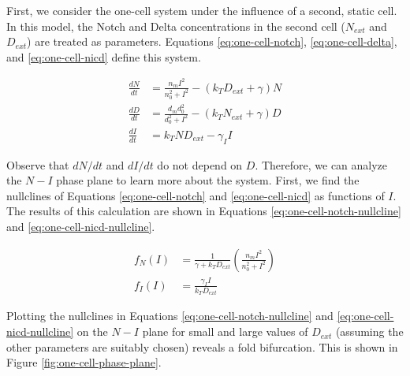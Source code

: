 \documentclass{article}
\begin{document}
\begin{flushleft}
First, we consider the one-cell system under the influence of a second, static cell. In this model, the Notch and Delta concentrations in the second cell ($N_{ext}$ and $D_{ext}$) are treated as parameters. Equations \ref{eq:one-cell-notch}, \ref{eq:one-cell-delta}, and \ref{eq:one-cell-nicd} define this system.

\begin{align}
  \label{eq:one-cell-notch}
  \frac{dN}{dt} &= \frac{n_{m}I^2}{n_{0}^2 + I^2} - (k_{T}D_{ext} + \gamma)N \\[5pt]
  \label{eq:one-cell-delta}
  \frac{dD}{dt} &= \frac{d_{m}d_{0}^2}{d_{0}^2 + I^2} - (k_{T}N_{ext} + \gamma)D \\[5pt]
  \label{eq:one-cell-nicd}
  \frac{dI}{dt} &= k_{T}ND_{ext} - \gamma_{I}I
\end{align}

Observe that $dN/dt$ and $dI/dt$ do not depend on $D$. Therefore, we can analyze the $N-I$ phase plane to learn more about the system. First, we find the nullclines of Equations \ref{eq:one-cell-notch} and \ref{eq:one-cell-nicd} as functions of $I$. The results of this calculation are shown in Equations \ref{eq:one-cell-notch-nullcline} and \ref{eq:one-cell-nicd-nullcline}.

\begin{align}
  \label{eq:one-cell-notch-nullcline}
  f_{N}(I) &= \frac{1}{\gamma + k_{T}D_{ext}}\left(\frac{n_{m}I^2}{n_{0}^2 + I^2}\right) \\[5pt]
  \label{eq:one-cell-nicd-nullcline}
  f_{I}(I) &= \frac{\gamma_{I}I}{k_{T}D_{ext}}
\end{align}

Plotting the nullclines in Equations \ref{eq:one-cell-notch-nullcline} and \ref{eq:one-cell-nicd-nullcline} on the $N-I$ plane for small and large values of $D_{ext}$ (assuming the other parameters are suitably chosen) reveals a fold bifurcation. This is shown in Figure \ref{fig:one-cell-phase-plane}.


\end{flushleft}
\end{document}
